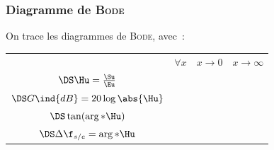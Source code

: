 \documentclass[../../main/main.tex]{subfiles}
\begin{document}
\subsubsection{Diagramme de \textsc{Bode}}
On trace les diagrammes de \textsc{Bode}, avec~:
\smallbreak
\noindent
\begin{minipage}{\linewidth}
	\centering
	\begin{tabularx}{\linewidth}{cYYY}
		\toprule
		 &
		$\forall x$
		 &
		$x\to 0$
		 &
		$x\to\infty$
		\\
		\addlinespace[0.5em]
		\cmidrule(lr){2-4}
		$\DS\Hu = \frac{\Su}{\Eu}$
		 &
		 &
		 &
		\\
		\addlinespace[0.5em]
		$\DS G\ind{dB} = 20 \log \abs{\Hu}$
		 &
		 &
		 &
		\\
		\addlinespace[0.5em]
		$\DS\tan(\arg*{\Hu})$
		 &
		 &
		 &
		\\
		\addlinespace[0.5em]
		$\DS\Delta\f_{s/e} = \arg*{\Hu}$
		 &
		\psw{$---$}
		 &
		 &
		\psw{$\DS -\pi$}
		\\
		\bottomrule
	\end{tabularx}
	\label{tab:rlc}
\end{minipage}
\end{document}
